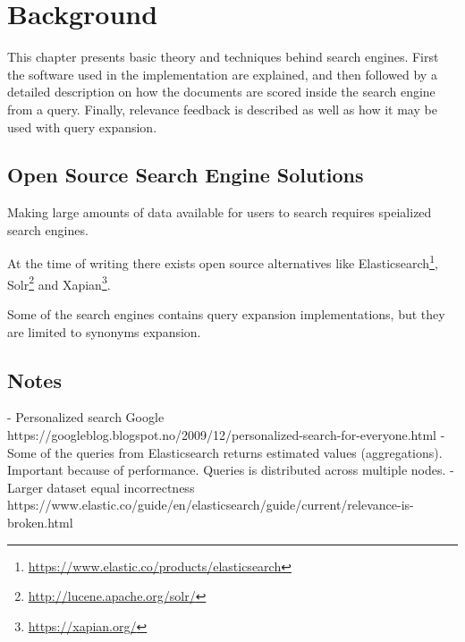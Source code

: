 \chapter{Background}
\label{ch:background}
This chapter presents basic theory and techniques behind search engines. First
the software used in the implementation are explained, and then followed by a
detailed description on how the documents are scored inside the search engine from a
query. Finally, relevance feedback is described as well as how it may be used with query
expansion.

\section{Open Source Search Engine Solutions}
Making large amounts of data available for users to search requires speialized search engines.

At the time of writing there exists open source alternatives like Elasticsearch\footnote{\url{https://www.elastic.co/products/elasticsearch}},
Solr\footnote{\url{http://lucene.apache.org/solr/}} and Xapian\footnote{\url{https://xapian.org/}}.

Some of the search engines contains query expansion implementations,
but they are limited to synonyms expansion.



%



\section{Notes}
- Personalized search Google https://googleblog.blogspot.no/2009/12/personalized-search-for-everyone.html
- Some of the queries from Elasticsearch returns estimated values (aggregations). Important because of performance. Queries is distributed across multiple nodes.
- Larger dataset equal incorrectness https://www.elastic.co/guide/en/elasticsearch/guide/current/relevance-is-broken.html
